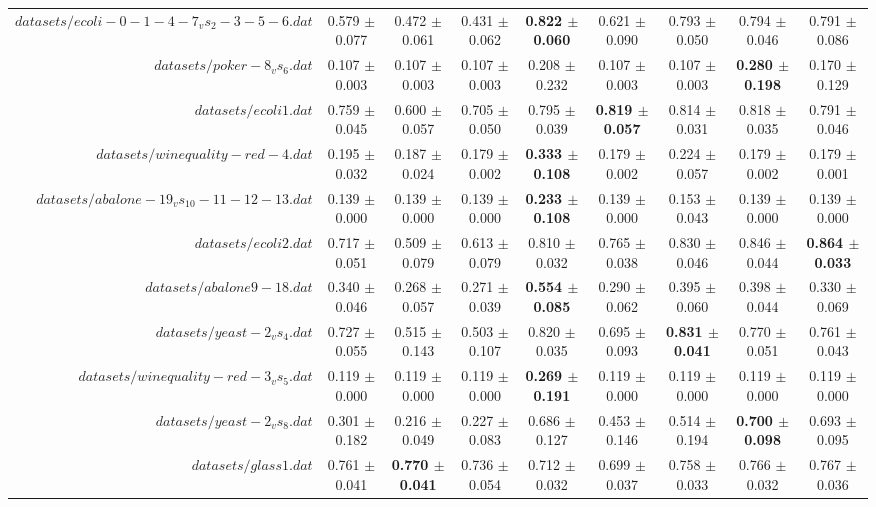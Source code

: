 \begin{table}[!ht]
{\begin{tabular}{r c c c c c c c c}
$datasets/ecoli-0-1-4-7_vs_2-3-5-6.dat$ & 0.579 $\pm$ 0.077 & 0.472 $\pm$ 0.061 & 0.431 $\pm$ 0.062 & \textbf{0.822 $\pm$ 0.060} & 0.621 $\pm$ 0.090 & 0.793 $\pm$ 0.050 & 0.794 $\pm$ 0.046 & 0.791 $\pm$ 0.086 \\
$datasets/poker-8_vs_6.dat$ & 0.107 $\pm$ 0.003 & 0.107 $\pm$ 0.003 & 0.107 $\pm$ 0.003 & 0.208 $\pm$ 0.232 & 0.107 $\pm$ 0.003 & 0.107 $\pm$ 0.003 & \textbf{0.280 $\pm$ 0.198} & 0.170 $\pm$ 0.129 \\
$datasets/ecoli1.dat$ & 0.759 $\pm$ 0.045 & 0.600 $\pm$ 0.057 & 0.705 $\pm$ 0.050 & 0.795 $\pm$ 0.039 & \textbf{0.819 $\pm$ 0.057} & 0.814 $\pm$ 0.031 & 0.818 $\pm$ 0.035 & 0.791 $\pm$ 0.046 \\
$datasets/winequality-red-4.dat$ & 0.195 $\pm$ 0.032 & 0.187 $\pm$ 0.024 & 0.179 $\pm$ 0.002 & \textbf{0.333 $\pm$ 0.108} & 0.179 $\pm$ 0.002 & 0.224 $\pm$ 0.057 & 0.179 $\pm$ 0.002 & 0.179 $\pm$ 0.001 \\
$datasets/abalone-19_vs_10-11-12-13.dat$ & 0.139 $\pm$ 0.000 & 0.139 $\pm$ 0.000 & 0.139 $\pm$ 0.000 & \textbf{0.233 $\pm$ 0.108} & 0.139 $\pm$ 0.000 & 0.153 $\pm$ 0.043 & 0.139 $\pm$ 0.000 & 0.139 $\pm$ 0.000 \\
$datasets/ecoli2.dat$ & 0.717 $\pm$ 0.051 & 0.509 $\pm$ 0.079 & 0.613 $\pm$ 0.079 & 0.810 $\pm$ 0.032 & 0.765 $\pm$ 0.038 & 0.830 $\pm$ 0.046 & 0.846 $\pm$ 0.044 & \textbf{0.864 $\pm$ 0.033} \\
$datasets/abalone9-18.dat$ & 0.340 $\pm$ 0.046 & 0.268 $\pm$ 0.057 & 0.271 $\pm$ 0.039 & \textbf{0.554 $\pm$ 0.085} & 0.290 $\pm$ 0.062 & 0.395 $\pm$ 0.060 & 0.398 $\pm$ 0.044 & 0.330 $\pm$ 0.069 \\
$datasets/yeast-2_vs_4.dat$ & 0.727 $\pm$ 0.055 & 0.515 $\pm$ 0.143 & 0.503 $\pm$ 0.107 & 0.820 $\pm$ 0.035 & 0.695 $\pm$ 0.093 & \textbf{0.831 $\pm$ 0.041} & 0.770 $\pm$ 0.051 & 0.761 $\pm$ 0.043 \\
$datasets/winequality-red-3_vs_5.dat$ & 0.119 $\pm$ 0.000 & 0.119 $\pm$ 0.000 & 0.119 $\pm$ 0.000 & \textbf{0.269 $\pm$ 0.191} & 0.119 $\pm$ 0.000 & 0.119 $\pm$ 0.000 & 0.119 $\pm$ 0.000 & 0.119 $\pm$ 0.000 \\
$datasets/yeast-2_vs_8.dat$ & 0.301 $\pm$ 0.182 & 0.216 $\pm$ 0.049 & 0.227 $\pm$ 0.083 & 0.686 $\pm$ 0.127 & 0.453 $\pm$ 0.146 & 0.514 $\pm$ 0.194 & \textbf{0.700 $\pm$ 0.098} & 0.693 $\pm$ 0.095 \\
$datasets/glass1.dat$ & 0.761 $\pm$ 0.041 & \textbf{0.770 $\pm$ 0.041} & 0.736 $\pm$ 0.054 & 0.712 $\pm$ 0.032 & 0.699 $\pm$ 0.037 & 0.758 $\pm$ 0.033 & 0.766 $\pm$ 0.032 & 0.767 $\pm$ 0.036 \\

\end{tabular}}
\end{table}
